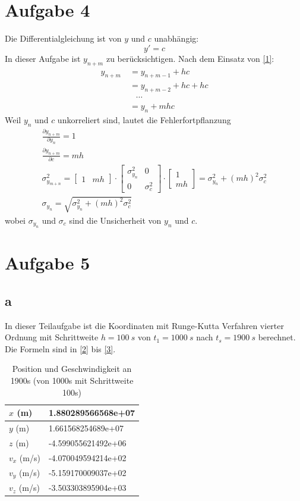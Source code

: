\section{Aufgabe 4}
Die Differentialgleichung ist von $y$ und $c$ unabhängig:
\begin{equation}\label{1}
	y' = c
\end{equation}
In dieser Aufgabe ist $y_{n+m}$ zu berücksichtigen. Nach dem Einsatz von \ref{1}:
\begin{align}
	y_{n+m} & \ = y_{n+m-1} + hc \\
	& \ = y_{n+m-2} +hc+hc \\
	 & \quad \cdots  \\
	 & \ = y_n + mhc
\end{align}
Weil $y_n$ und $c$ unkorreliert sind, lautet die Fehlerfortpflanzung
\begin{gather}
	\frac{\partial y_{n+m}}{\partial y_n} = 1 \\
	\frac{\partial y_{n+m}}{\partial c} = mh \\
	\sigma^2_{y_{m+n}} = \begin{bmatrix}
	1 & mh
	\end{bmatrix} \cdot \begin{bmatrix}
	\sigma^2_{y_n} & 0 \\
	0 & \sigma^2_{c}
	\end{bmatrix} \cdot \begin{bmatrix}
	1 \\
    mh
	\end{bmatrix} = \sigma^2_{y_n} + (mh)^2\sigma^2_{c}\\
	\sigma_{y_n} = \sqrt{\sigma^2_{y_n} + (mh)^2\sigma^2_{c}}
\end{gather}
wobei $\sigma_{y_n}$ und $\sigma_{c}$ sind die Unsicherheit von $y_n$ und $c$. \clearpage
\section{Aufgabe 5}
\subsection{a}\label{seca}
In dieser Teilaufgabe ist die Koordinaten mit Runge-Kutta Verfahren vierter Ordnung mit Schrittweite $h = \SI{100}{s}$ von $t_1 = \SI{1000}{s}$ nach $t_s = \SI{1900}{s}$ berechnet. Die Formeln sind in \ref{2} bis \ref{3}. 
\begin{table}[htbp] \centering
	\begin{tabular}{|l|l|}
		\hline
		$x$ (m)     & 1.880289566568e+07  \\ \hline
		$y$ (m)     & 1.661568254689e+07  \\ \hline
		$z$ (m)     & -4.599055621492e+06 \\ \hline
		$v_x$ (m/s) & -4.070049594214e+02  \\ \hline
		$v_y$ (m/s) & -5.159170009037e+02 \\ \hline
		$v_z$ (m/s) & -3.503303895904e+03 \\ \hline
	\end{tabular}
	\caption{Position und Geschwindigkeit an 1900s (von 1000s mit Schrittweite 100s)}
\end{table}
